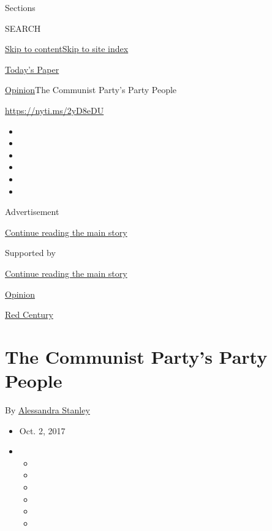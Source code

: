 Sections

SEARCH

\protect\hyperlink{site-content}{Skip to
content}\protect\hyperlink{site-index}{Skip to site index}

\href{https://myaccount.nytimes3xbfgragh.onion/auth/login?response_type=cookie\&client_id=vi}{}

\href{https://www.nytimes3xbfgragh.onion/section/todayspaper}{Today's
Paper}

\href{/section/opinion}{Opinion}\textbar{}The Communist Party's Party
People

\url{https://nyti.ms/2yD8eDU}

\begin{itemize}
\item
\item
\item
\item
\item
\item
\end{itemize}

Advertisement

\protect\hyperlink{after-top}{Continue reading the main story}

Supported by

\protect\hyperlink{after-sponsor}{Continue reading the main story}

\href{/section/opinion}{Opinion}

\href{/column/red-century}{Red Century}

\hypertarget{the-communist-partys-party-people}{%
\section{The Communist Party's Party
People}\label{the-communist-partys-party-people}}

By
\href{http://www.nytimes3xbfgragh.onion/by/alessandra-stanley}{Alessandra
Stanley}

\begin{itemize}
\item
  Oct. 2, 2017
\item
  \begin{itemize}
  \item
  \item
  \item
  \item
  \item
  \item
  \end{itemize}
\end{itemize}

